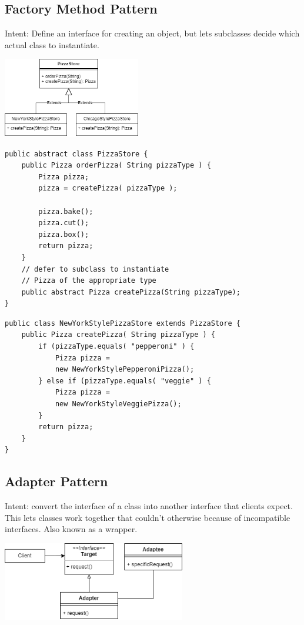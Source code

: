 \documentclass[8pt, letterpaper, titlepage]{article}
\begin{document}
\newpage
\begin{multicols*}{2}
    \subsection*{Factory Method Pattern}
    Intent: Define an interface for creating an object, but lets subclasses decide which actual class to instantiate.
    \begin{center} 
        \includegraphics[width=6cm]{factory.png}
    \end{center}

    \begin{lstlisting}
public abstract class PizzaStore {
    public Pizza orderPizza( String pizzaType ) {
        Pizza pizza;
        pizza = createPizza( pizzaType );
        
        pizza.bake();
        pizza.cut();
        pizza.box();
        return pizza;
    }
    // defer to subclass to instantiate
    // Pizza of the appropriate type
    public abstract Pizza createPizza(String pizzaType);
}               
    \end{lstlisting}
    \begin{lstlisting}
public class NewYorkStylePizzaStore extends PizzaStore {
    public Pizza createPizza( String pizzaType ) {
        if (pizzaType.equals( "pepperoni" ) {
            Pizza pizza =
            new NewYorkStylePepperoniPizza();
        } else if (pizzaType.equals( "veggie" ) {
            Pizza pizza =
            new NewYorkStyleVeggiePizza();
        }
        return pizza;
    }
}        
    \end{lstlisting}
    \subsection*{Adapter Pattern}
    Intent: convert the interface of a class into another interface that clients expect. This lets classes work together that couldn't otherwise because of incompatible interfaces. Also known as a wrapper.

    \begin{center} 
        \includegraphics[width=8cm]{wrapper.png}
    \end{center}


\end{multicols*}
\end{document}
